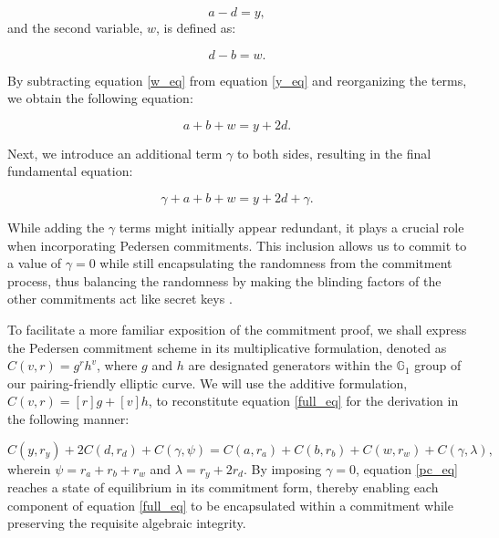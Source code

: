 \documentclass{iacrcc}
\theoremstyle{definition}
\begin{document}
\begin{equation}
\label{y_eq}
a - d = y,
\end{equation}
and the second variable, \( w \), is defined as:

\begin{equation}
\label{w_eq}
d - b = w.
\end{equation}

By subtracting equation \ref{w_eq} from equation \ref{y_eq} and reorganizing the terms, we obtain the following equation:

\begin{equation}
\label{half_eq}
a + b + w = y + 2d.
\end{equation}

Next, we introduce an additional term \( \gamma \) to both sides, resulting in the final fundamental equation:

\begin{equation}
\label{full_eq}
\gamma + a + b + w = y + 2d + \gamma.
\end{equation}

While adding the \( \gamma \) terms might initially appear redundant, it plays a crucial role when incorporating Pedersen commitments. This inclusion allows us to commit to a value of \( \gamma = 0 \) while still encapsulating the randomness from the commitment process, thus balancing the randomness by making the blinding factors of the other commitments act like secret keys \cite{mimblewimble2016}.

To facilitate a more familiar exposition of the commitment proof, we shall express the Pedersen commitment scheme in its multiplicative formulation, denoted as \( C(v, r) = g^{r} h^{v} \), where \( g \) and \( h \) are designated generators within the \( \mathbb{G}_{1} \) group of our pairing-friendly elliptic curve. We will use the additive formulation, \( C(v, r) = [r]g + [v]h \), to reconstitute equation \ref{full_eq} for the derivation in the following manner:

\begin{equation}
\label{pc_eq}
C(y, r_{y}) + 2 C(d, r_{d}) + C(\gamma, \psi) = C(a, r_{a}) + C(b, r_{b}) + C(w, r_{w}) + C(\gamma, \lambda),
\end{equation}
wherein \( \psi = r_{a} + r_{b} + r_{w} \) and \( \lambda = r_{y} + 2r_{d} \). By imposing \( \gamma = 0 \), equation \ref{pc_eq} reaches a state of equilibrium in its commitment form, thereby enabling each component of equation \ref{full_eq} to be encapsulated within a commitment while preserving the requisite algebraic integrity.
\end{document}
